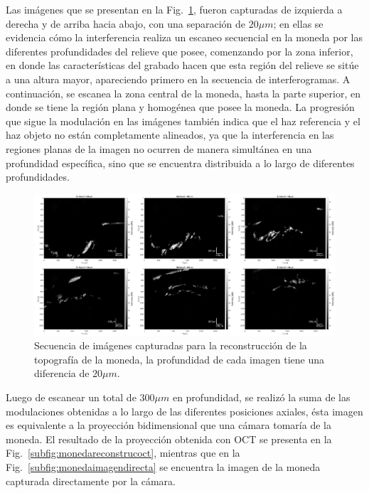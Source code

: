 Las imágenes que se presentan en la Fig.~\ref{fig:Enface_Sequence}, fueron capturadas de izquierda a derecha y de arriba hacia abajo, con una separación de $20\mu m$; en ellas se evidencia cómo la interferencia realiza un escaneo secuencial en la moneda por las diferentes profundidades del relieve que posee, comenzando por la zona inferior, en donde las características del grabado hacen que esta región del relieve se sitúe a una altura mayor, apareciendo primero en la secuencia de interferogramas. A continuación, se escanea la zona central de la moneda, hasta la parte superior, en donde se tiene la región plana y homogénea que posee la moneda. La progresión que sigue la modulación en las imágenes también indica que el haz referencia y el haz objeto no están completamente alineados, ya que la interferencia en las regiones planas de la imagen no ocurren de manera simultánea en una profundidad específica, sino que se encuentra distribuida a lo largo de diferentes profundidades.
\begin{figure}[!h]
	\centering
	\includegraphics[width=1.0\linewidth]{img/chap2/Enface_Sequence}
	\caption[Secuencia de imágenes capturadas por la cámara.]{Secuencia de imágenes capturadas para la reconstrucción de la topografía de la moneda, la profundidad de cada imagen tiene una diferencia de $20\mu m$.}
	\label{fig:Enface_Sequence}
\end{figure}
\noindent Luego de escanear un total de $300\mu m$ en profundidad, se realizó la suma de las modulaciones obtenidas a lo largo de las diferentes posiciones axiales, ésta imagen es equivalente a la proyección bidimensional que una cámara tomaría de la moneda. El resultado de la proyección obtenida con OCT se presenta en la Fig.~\ref{subfig:monedareconstrucoct}, mientras que en la Fig.~\ref{subfig:monedaimagendirecta} se encuentra la imagen de la moneda capturada directamente por la cámara.

